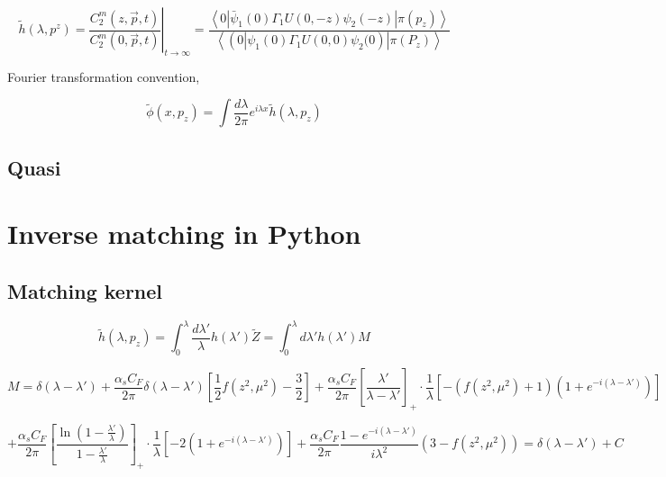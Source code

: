 \documentclass{article}
\begin{document}
\begin{equation}
    \widetilde{h}\left(\lambda, p^{z}\right)=\left.\frac{C_{2}^{m}(z, \vec{p}, t)}{C_{2}^{m}(0, \vec{p}, t)}\right|_{t \rightarrow \infty}=\frac{\left\langle 0\left|\bar{\psi}_{1}(0) \Gamma_{1} U(0,-z) \psi_{2}(-z)\right| \pi\left(p_{z}\right)\right\rangle}{\left\langle\left(0\left|\psi_{1}(0) \Gamma_{1} U(0,0) \psi_{2}  (0\right) \right| \pi\left(P_{z}\right)\right\rangle}
\end{equation}

Fourier transformation convention,

\begin{equation}
    \tilde{\phi}\left(x, p_{z}\right)=\int \frac{d \lambda}{2 \pi} e^{i \lambda x} \tilde{h}\left(\lambda, p_{z}\right)
\end{equation}

\subsection{Quasi}





\section{Inverse matching in Python}

\subsection{Matching kernel}
\begin{equation}
    \tilde{h}\left(\lambda, p_{z}\right)=\int_{0}^{\lambda} \frac{d \lambda'}{\lambda}  h(\lambda') \tilde{Z} = \int_{0}^{\lambda} d \lambda'  h(\lambda') M 
\end{equation}

\begin{equation}
    M = \delta(\lambda - \lambda') + \frac{\alpha_s C_F}{2 \pi} \delta(\lambda - \lambda') [\frac{1}{2}f(z^2, \mu^2) - \frac{3}{2}] + \frac{\alpha_s C_F}{2 \pi} [\frac{\lambda'}{\lambda - \lambda'}]_{+} \cdot \frac{1}{\lambda} [-(f(z^2, \mu^2)+1)(1+e^{-i(\lambda - \lambda')})]
\end{equation}

\begin{equation}\nonumber
    + \frac{\alpha_s C_F}{2 \pi} [\frac{\ln(1-\frac{\lambda'}{\lambda})}{1-\frac{\lambda'}{\lambda}}]_{+} \cdot \frac{1}{\lambda} [-2(1 + e^{-i(\lambda - \lambda')})] + \frac{\alpha_s C_F}{2 \pi} \frac{1- e^{-i(\lambda - \lambda')}}{i \lambda^2} (3 - f(z^2, \mu^2)) = \delta(\lambda - \lambda') + C
\end{equation}
\end{document}
